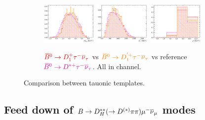 \begin{figure}[!htb]
    \begin{subfigure}{\textwidth}
        \centering
        \includegraphics[width=0.3\textwidth]{figs-fit-fit-templates/histo-comp/Dst_iso_DstTau__vs__Dst_iso_D1ststTau__vs__Dst_iso_D1pststTau__m2miss.pdf}
        \includegraphics[width=0.3\textwidth]{figs-fit-fit-templates/histo-comp/Dst_iso_DstTau__vs__Dst_iso_D1ststTau__vs__Dst_iso_D1pststTau__el.pdf}
        \includegraphics[width=0.3\textwidth]{figs-fit-fit-templates/histo-comp/Dst_iso_DstTau__vs__Dst_iso_D1ststTau__vs__Dst_iso_D1pststTau__q2.pdf}
        \caption{
            $\textcolor{red}{{{\kern 0.18em\overline{\kern -0.18em B}}{}^0} \rightarrow {\ensuremath{D}}_1^+{\tau^-}{{\overline{\nu}}_\tau}}$
            vs
            $\textcolor{orange}{{{\kern 0.18em\overline{\kern -0.18em B}}{}^0} \rightarrow {\ensuremath{D}}_1^{'+} {\tau^-}{{\overline{\nu}}_\tau}}$
            vs reference
            $\textcolor{magenta}{{{\kern 0.18em\overline{\kern -0.18em B}}{}^0} \rightarrow {\ensuremath{{D}^{*+}}}{\ensuremath{\tau^-}}{\ensuremath{{\overline{\nu}}_\tau}}}$.
            All in \Dstar channel.
        }
    \end{subfigure}

    \caption{Comparison between tauonic \Dstst templates.}
    \label{fig:dstst-tau}
\end{figure}


\subsection{Feed down of $B \rightarrow D_H^{**}(\rightarrow D^{(*)}\pi\pi){\mu^-}{{\overline{\nu}}_\mu}$ modes}

